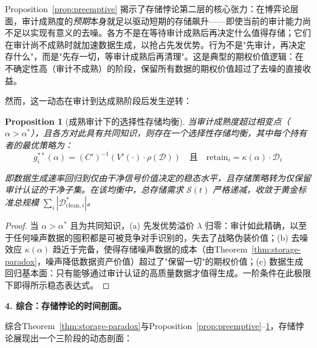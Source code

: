 \documentclass[12pt,a4paper]{ctexart}
\newtheorem{proposition}[theorem]{Proposition}
\theoremstyle{definition}
\theoremstyle{remark}
\begin{document}
Proposition~\ref{prop:preemptive} 揭示了存储悖论第二层的核心张力：在博弈论层面，审计成熟度的\textit{预期}本身就足以驱动短期的存储飙升——即使当前的审计能力尚不足以实现有意义的去噪。各方不是在等待审计成熟后再决定什么值得存储；它们在审计尚不成熟时就加速数据生成，以抢占先发优势。行为不是"先审计，再决定存什么"，而是"先存一切，等审计成熟后再清理"。这是典型的期权价值逻辑：在不确定性高（审计不成熟）的阶段，保留所有数据的期权价值超过了去噪的直接收益。

然而，这一动态在审计到达成熟阶段后发生逆转：

\begin{proposition}[成熟审计下的选择性存储均衡]
\label{prop:mature}
当审计成熟度超过相变点（$\alpha > \alpha^*$），且各方对此具有共同知识，则存在一个\textit{选择性存储均衡}，其中每个持有者的最优策略为：
\begin{equation}
g_i^{**}(\alpha) = (C')^{-1}\left(V'(\cdot) \cdot \rho(\mathcal{D})\right) \quad \text{且} \quad \text{retain}_i = \kappa(\alpha) \cdot \mathcal{D}_i
\end{equation}

即数据生成速率回归到仅由干净信号价值决定的稳态水平，且存储策略转为仅保留审计认证的干净子集。在该均衡中，总存储需求 $\mathcal{S}(t)$ 严格递减，收敛于黄金标准总规模 $\sum_i |\mathcal{D}_{\text{clean}, i}^*|$。
\end{proposition}

\begin{proof}
当 $\alpha > \alpha^*$ 且为共同知识，(a) 先发优势溢价 $\lambda$ 归零：审计如此精确，以至于任何噪声数据的囤积都是可被竞争对手识别的，失去了战略伪装价值；(b) 去噪效应 $\kappa(\alpha)$ 趋近于完备，使得存储噪声数据的成本（由Theorem~\ref{thm:storage-paradox}，噪声降低数据资产价值）超过了"保留一切"的期权价值；(c) 数据生成回归基本面：只有能够通过审计认证的高质量数据才值得生成。一阶条件在此极限下即得所示稳态表达式。
\end{proof}

\medskip
\noindent\textbf{4. 综合：存储悖论的时间剖面。}

综合Theorem~\ref{thm:storage-paradox}与Proposition~\ref{prop:preemptive}–\ref{prop:mature}，存储悖论展现出一个三阶段的动态剖面：
\end{document}
